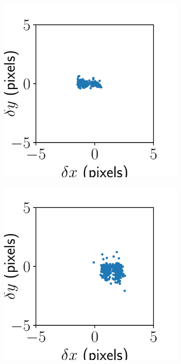 \documentclass{article}
\begin{document}
\begin{figure}[ht]
	\centering
	\begin{subfigure}{0.24\linewidth}
		\includegraphics[width=\linewidth]{alignment-result-AKY-4.pdf}
		\caption{}
		\label{fig:alignmentresultAKY4}
	\end{subfigure}
	\begin{subfigure}{0.24\linewidth}
		\includegraphics[width=\linewidth]{alignment-result-AKY-3.pdf}

\end{subfigure}
\end{figure}
\end{document}

